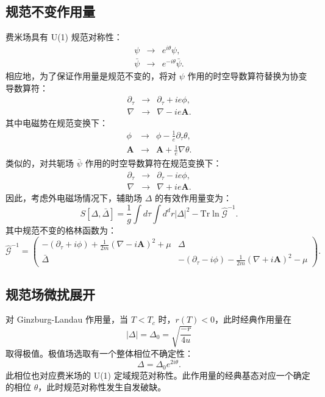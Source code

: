 \documentclass[10pt,UTF8]{ctexart}
\begin{document}
\subsection*{规范不变作用量}
\noindent 费米场具有 U(1) 规范对称性：
\begin{eqnarray}
	\psi &\rightarrow & e^{i\theta} \psi, \\
	\bar\psi & \rightarrow & e^{-i\theta} \bar\psi.
\end{eqnarray}
相应地，为了保证作用量是规范不变的，将对 $\psi$ 作用的时空导数算符替换为协变导数算符：
\begin{eqnarray}
	\partial_\tau & \rightarrow & \partial_\tau + ie\phi, \\
	\nabla & \rightarrow & \nabla - ie \bm A.
\end{eqnarray}
其中电磁势在规范变换下：
\begin{eqnarray}
	\phi & \rightarrow & \phi - \frac{1}{e} \partial_\tau \theta, \\
	\bm A & \rightarrow & \bm A+ \frac{1}{e} \nabla\theta.
\end{eqnarray}
类似的，对共轭场 $\bar\psi$ 作用的时空导数算符在规范变换下：
\begin{eqnarray}
	\partial_\tau & \rightarrow & \partial_\tau - ie\phi, \\
	\nabla & \rightarrow & \nabla + ie \bm A.
\end{eqnarray}
因此，考虑外电磁场情况下，辅助场 $\Delta$ 的有效作用量变为：
\begin{equation}
	S[\Delta,\bar\Delta]=\frac{1}{g}\int d\tau \int d^d r |\Delta|^2
	- \mathrm{Tr}\ln \hat{\mathcal G}^{-1}.
\end{equation}
其中规范不变的格林函数为：
\begin{equation}
	\hat{\mathcal G}^{-1} = \left( 
	\begin{array}{cc}
		-(\partial_\tau+i\phi)+\frac{1}{2m}(\nabla-i\bm A)^2+\mu & \Delta \\
		\bar\Delta & -(\partial_\tau-i\phi)-\frac{1}{2m}(\nabla+i\bm A)^2-\mu
	\end{array}
	\right).
\end{equation}

\subsection*{规范场微扰展开}
\noindent 对 Ginzburg-Landau 作用量，当 $T < T_c$ 时，$r(T) < 0$，此时经典作用量在
\begin{equation}
	|\Delta| = \Delta_0 = \sqrt{\frac{-r}{4u}}
\end{equation}
取得极值。极值场选取有一个整体相位不确定性：
\begin{equation}
	\Delta = \Delta_0 e^{2i\theta}.
\end{equation}
此相位也对应费米场的 U(1) 定域规范对称性。此作用量的经典基态对应一个确定的相位 $\theta$，此时规范对称性发生自发破缺。
\end{document}
